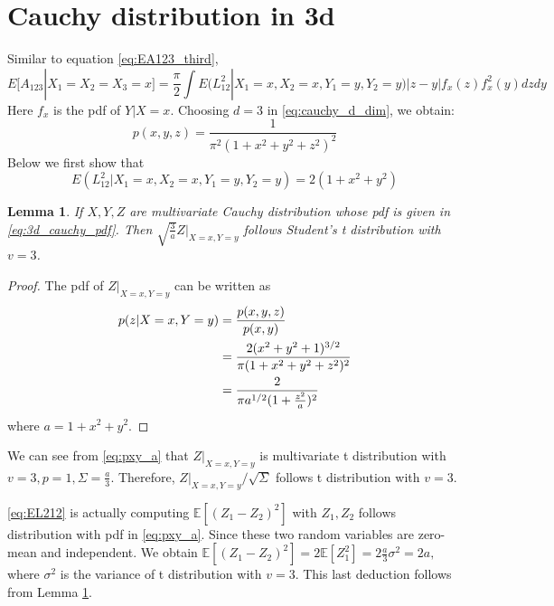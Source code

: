 \documentclass{article}
\newtheorem{lemma}{Lemma}
\def\E{\mathbb{E}}
\begin{document}
\section{Cauchy distribution in 3d}
Similar to equation
\ref{eq:EA123_third},
\begin{equation}\label{eq:EA123_third_conditional}
    E[A_{123}|X_1=X_2=X_3=x] =\frac{\pi}{2}
    \int E(L^2_{12} | X_1=x, X_2=x,Y_1=y, Y_2=y)
    |z-y|f_x(z)f_x^2(y)dzdy
\end{equation}
Here $f_x$ is the pdf of $Y|X=x$.
Choosing $d=3$ in \eqref{eq:cauchy_d_dim},
we obtain:
\begin{equation}\label{eq:3d_cauchy_pdf}
    p(x,y,z)=\frac{1}{\pi^2 \left(
        1 + x^2 + y^2 + z^2
    \right)^2}
\end{equation}
Below we first show that
\begin{equation}\label{eq:EL212}
    E(L^2_{12} | X_1=x, X_2=x,Y_1=y, Y_2=y) = 2(1+x^2+y^2)
\end{equation}
\begin{lemma}\label{lemma_xyz_t_distribution}
    If $X, Y, Z$ are multivariate Cauchy distribution whose pdf is
    given in \eqref{eq:3d_cauchy_pdf}.
    Then $\sqrt{\frac{3}{a}} Z|_{X=x,Y=y}$ follows Student's t distribution with $v=3$.
\end{lemma}
\begin{proof}
    The pdf of $Z|_{X=x,Y=y}$
    can be written as
    \begin{align}
        p(z|X=x,Y=y)
        & = \frac{p(x,y,z)}{p(x,y)}\notag \\
        & = \frac{2(x^2+y^2+1)^{3/2}}{
            \pi (1+x^2+y^2+z^2)^2
        } \notag\\
        & = \frac{2}{\pi a^{1/2} (1+\frac{z^2}{a})^2}
        \label{eq:pxy_a}
    \end{align}
    where $ a = 1+x^2+y^2$.
\end{proof}

We can see from \eqref{eq:pxy_a} that
$Z|_{X=x,Y=y}$ is multivariate t distribution with $v=3, p =1, \Sigma=\frac{a}{3}$.
Therefore, $Z|_{X=x,Y=y}/\sqrt{\Sigma}$ follows
t distribution with $v=3$.

\eqref{eq:EL212} is actually computing
$\E[(Z_1 - Z_2)^2]$ with $Z_1, Z_2$ follows distribution with pdf in
\eqref{eq:pxy_a}. Since these two random variables are zero-mean and independent.
We obtain $\E[(Z_1 - Z_2)^2]
=2\E[Z_1^2] = 2 \frac{a}{3} \sigma^2=2a, $
where $\sigma^2$ is the variance of t distribution with $v=3$.
This last deduction follows from 
Lemma \ref{lemma_xyz_t_distribution}.
\end{document}

